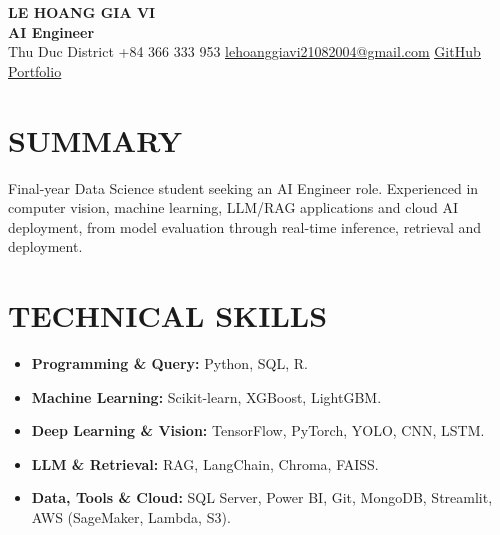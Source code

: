 \documentclass[10pt,letterpaper]{article}
\newcommand{\cvsection}[2]{\section*{\faIcon{#1}\hspace{0.45em}#2}}
\newcommand{\cvlink}[2]{\href{#1}{\underline{#2}}}
\newcommand{\cvitem}[1]{\item \small #1}
\begin{document}
\begin{center}
  {\fontsize{20}{22}\selectfont\bfseries LE HOANG GIA VI}\\[0.22em]
  {\fontsize{17}{19}\selectfont\bfseries AI Engineer}\\[0.42em]
  {\small
  \hspace{0.2em}Thu Duc District
  \quad
  \hspace{0.2em}+84 366 333 953
  \quad
  \hspace{0.2em}\cvlink{mailto:lehoanggiavi21082004@gmail.com}{lehoanggiavi21082004@gmail.com}
  \quad
  \hspace{0.2em}\cvlink{https://github.com/lehoanggiavi}{GitHub}
  \quad
  \hspace{0.2em}\cvlink{https://lehoanggiavi.github.io/portfolio/?role=ai}{Portfolio}}
\end{center}

\cvsection{user}{SUMMARY}
\normalsize
Final-year Data Science student seeking an AI Engineer role. Experienced in computer vision,
machine learning, LLM/RAG applications and cloud AI deployment, from model evaluation through
real-time inference, retrieval and deployment.

\cvsection{tools}{TECHNICAL SKILLS}
\begin{itemize}[leftmargin=1.55em,itemsep=0em,topsep=0em,parsep=0em]
  \cvitem{\textbf{Programming \& Query:} Python, SQL, R.}
  \cvitem{\textbf{Machine Learning:} Scikit-learn, XGBoost, LightGBM.}
  \cvitem{\textbf{Deep Learning \& Vision:} TensorFlow, PyTorch, YOLO, CNN, LSTM.}
  \cvitem{\textbf{LLM \& Retrieval:} RAG, LangChain, Chroma, FAISS.}
  \cvitem{\textbf{Data, Tools \& Cloud:} SQL Server, Power BI, Git, MongoDB, Streamlit, AWS (SageMaker, Lambda, S3).}
\end{itemize}
\end{document}
